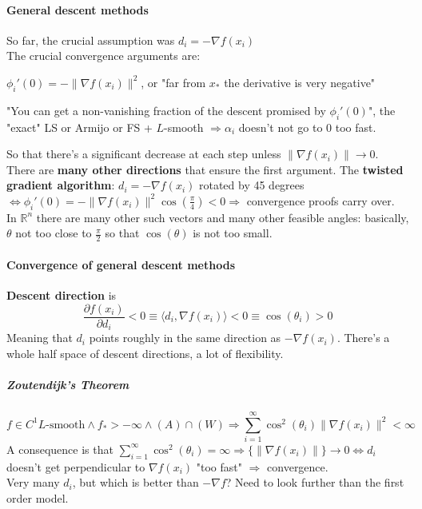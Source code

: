 \documentclass[10pt]{report}
\begin{document}
\paragraph{General descent methods} So far, the crucial assumption was $d_i = -\nabla f(x_i)$\\
The crucial convergence arguments are:
\begin{list}{}{}
	\item $\phi_i'(0) = -\|\nabla f(x_i)\|^2$, or "far from $x_*$ the derivative is very negative"
	\item "You can get a non-vanishing fraction of the descent promised by $\phi_i'(0)$", the "exact" LS or Armijo or FS + $L$-smooth $\Rightarrow \alpha_i$ doesn't not go to 0 too fast.
\end{list}
So that there's a significant decrease at each step unless $\|\nabla f(x_i)\|\rightarrow 0$.\\
There are \textbf{many other directions} that ensure the first argument. The \textbf{twisted gradient algorithm}: $d_i = -\nabla f(x_i)$ rotated by 45 degrees $\Leftrightarrow \phi_i'(0) = -\|\nabla f(x_i)\|^2\cos(\frac{\pi}{4}) < 0 \Rightarrow$ convergence proofs carry over.\\
In $\mathbb{R}^n$ there are many other such vectors and many other feasible angles: basically, $\theta$ not too close to $\frac{\pi}{2}$ so that $\cos(\theta)$ is not too small.
\paragraph{Convergence of general descent methods} \textbf{Descent direction} is $$\frac{\partial f(x_i)}{\partial d_i} < 0 \equiv \langle d_i,\nabla f(x_i)\rangle < 0 \equiv \cos(\theta_i) > 0$$ Meaning that $d_i$ points roughly in the same direction as $-\nabla f(x_i)$. There's a whole half space of descent directions, a lot of flexibility.
\subparagraph{Zoutendijk's Theorem}  $$f\in C^1 L\text{-smooth}\land f_*>-\infty\land (A)\cap(W)\Rightarrow\sum_{i=1}^\infty\cos^2(\theta_i)\|\nabla f(x_i)\|^2<\infty$$
A consequence is that $\sum_{i=1}^\infty\cos^2(\theta_i) = \infty \Rightarrow \{\|\nabla f(x_i)\|\}\rightarrow 0 \Leftrightarrow d_i$ doesn't get perpendicular to $\nabla f(x_i)$ "too fast" $\Rightarrow$ convergence.\\
Very many $d_i$, but which is better than $-\nabla f$? Need to look further than the first order model.
\end{document}
